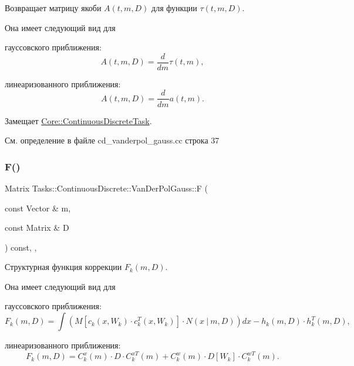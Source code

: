 Возвращает матрицу якоби $A(t, m, D)$ для функции $\tau(t, m, D)$. 

Она имеет следующий вид для


\begin{DoxyItemize}
\item гауссовского приближения\+: \[A(t, m, D) = \frac{d}{dm} \tau(t, m),\]
\item линеаризованного приближения\+: \[A(t, m, D) = \frac{d}{dm} a(t, m).\] 
\end{DoxyItemize}

Замещает \hyperlink{class_core_1_1_continuous_discrete_task_a332d99b61aabb919bffe75d0eec05cfe}{Core\+::\+Continuous\+Discrete\+Task}.



См. определение в файле cd\+\_\+vanderpol\+\_\+gauss.\+cc строка 37

\hypertarget{class_tasks_1_1_continuous_discrete_1_1_van_der_pol_gauss_adbd6671eb347348b68db28d899484336}{}\label{class_tasks_1_1_continuous_discrete_1_1_van_der_pol_gauss_adbd6671eb347348b68db28d899484336} 
\subsubsection{\texorpdfstring{F()}{F()}}
{\footnotesize\ttfamily Matrix Tasks\+::\+Continuous\+Discrete\+::\+Van\+Der\+Pol\+Gauss\+::F (\begin{DoxyParamCaption}\item[{const Vector \&}]{m,  }\item[{const Matrix \&}]{D }\end{DoxyParamCaption}) const\hspace{0.3cm}{\ttfamily [override]}, {\ttfamily [protected]}, {\ttfamily [virtual]}}



Структурная функция коррекции $F_k(m, D)$. 

Она имеет следующий вид для


\begin{DoxyItemize}
\item гауссовского приближения\+: \[F_k(m, D) = \int (M[c_k(x,W_k)\cdot c_k^T(x, W_k)] \cdot N(x\ |\ m,D))dx - h_k(m,D)\cdot h_k^T(m,D),\]
\item линеаризованного приближения\+: \[F_k(m, D) = C_k^x(m)\cdot D\cdot C_k^{xT}(m) + C_k^w(m)\cdot D[W_k]\cdot C_k^{wT}(m).\]
\end{DoxyItemize}

